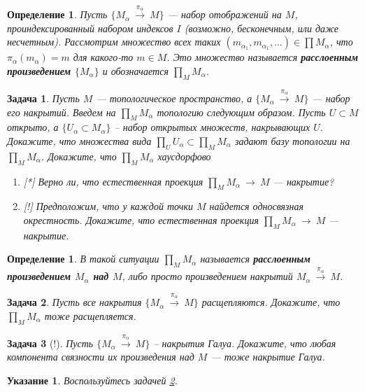 \documentclass[12pt]{book}
\newcommand{\arrow}{{\:\longrightarrow\:}}
\theoremstyle{upshape}
\newtheorem{zadacha}{Задача}[chapter]
\theoremstyle{generic}
\newtheorem{opredelenie}[teorema]{Определение}
\theoremstyle{upshapenonumber}
\newtheorem{ukazanie}{Указание}[section]
\newcommand{\следствие}{%
     \refstepcounter{teorema}
     {\noindent\bf Следствие \thechapter.\arabic{teorema}:\ }}
\newcommand{\пример}{%
     \refstepcounter{teorema}
     {\noindent\bf Пример \thechapter.\arabic{teorema}:\ }}
\newcommand{\лемма}{%
     \refstepcounter{teorema}
     {\noindent\bf Лемма \thechapter.\arabic{teorema}:\ }}
\newcommand{\теорема}{%
     \refstepcounter{teorema}
     {\noindent\bf Теорема \thechapter.\arabic{teorema}:\ }}
\newcommand{\утверждение}{%
     \refstepcounter{teorema}
     {\noindent\bf Утверждение \thechapter.\arabic{teorema}:\ }}
\def\ит{\it}
\def\итем{\item %
}
\begin{document}
{\begin{opredelenie}
Пусть $\{M_\alpha\stackrel{\pi_\alpha}\arrow M\}$ --- набор
отображений на $M$,
проиндексированный набором индексов $I$ (возможно,
бесконечным, или даже несчетным).
Рассмотрим множество всех таких 
$(m_{\alpha_1}, m_{\alpha_1},\dots)\in \prod M_{\alpha}$,
что $\pi_{\alpha}(m_\alpha)=m$ для какого-то 
$m\in M$. Это множество называется {\bf расслоенным
произведением $\{M_{\alpha}\}$} и обозначается
$\prod_M M_{\alpha}$.
\end{opredelenie}

\begin{zadacha}
Пусть $M$ --- топологическое пространство, а
$\{M_\alpha\stackrel{\pi_\alpha}\arrow M\}$ --- набор его накрытий.
Введем на $\prod_M M_{\alpha}$ топологию следующим образом. Пусть
$U\subset M$ открыто, а $\{U_\alpha\subset M_{\alpha}\}$ --
набор открытых множеств, накрывающих $U$. Докажите, что
множества вида $\prod_U U_\alpha\subset \prod_M M_{\alpha}$
задают базу топологии на $\prod_M M_{\alpha}$.
Докажите, что $\prod_M M_{\alpha}$ хаусдорфово
\begin{enumerate}
\итем[*] Верно ли, что естественная проекция 
$\prod_M M_{\alpha}\arrow M$ --- накрытие?

\итем[!] Предположим, что у каждой точки $M$
найдется односвязная окрестность. Докажите, что
естественная проекция $\prod_M M_{\alpha}\arrow M$ --- накрытие.
\end{enumerate}
\end{zadacha}

\begin{opredelenie}
В такой ситуации $\prod_M M_{\alpha}$ называется
{\bf расслоенным произведением $M_{\alpha}$ над $M$}, либо
просто произведением накрытий
$M_\alpha\stackrel{\pi_\alpha}\arrow M$.
\end{opredelenie}

\begin{zadacha} \label{_rascheplya_product_Zadacha_}
Пусть все накрытия $\{M_\alpha\stackrel{\pi_\alpha}\arrow M\}$
расщепляются. Докажите, что $\prod_M M_{\alpha}$ тоже расщепляется.
\end{zadacha}

\begin{zadacha}[!]
Пусть $\{M_\alpha\stackrel{\pi_\alpha}\arrow M\}$
-- накрытия Галуа. Докажите, что любая компонента связности
их произведения над $M$ --- тоже накрытие Галуа.
\end{zadacha}

\begin{ukazanie}
Воспользуйтесь задачей \ref{_rascheplya_product_Zadacha_}.
\end{ukazanie}

}
\end{document}
